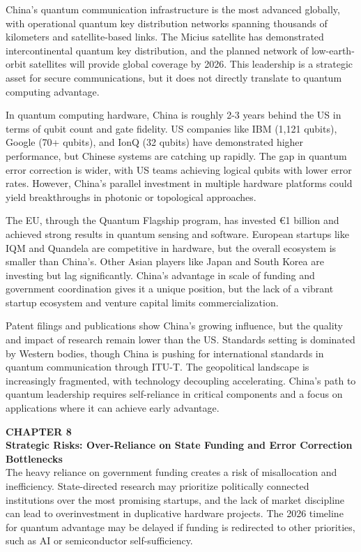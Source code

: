 \documentclass[10pt,a4paper]{article}
\newcommand{\kicker}[1]{\textcolor{BOBlue}{\scriptsize\bfseries\MakeUppercase{#1}}\\[-2pt]}
\newcommand{\Needspace}[1]{\par\vspace{2pt}}
\begin{document}
{\small China's quantum communication infrastructure is the most advanced globally, with operational quantum key distribution networks spanning thousands of kilometers and satellite-based links. The Micius satellite has demonstrated intercontinental quantum key distribution, and the planned network of low-earth-orbit satellites will provide global coverage by 2026. This leadership is a strategic asset for secure communications, but it does not directly translate to quantum computing advantage.}

{\small In quantum computing hardware, China is roughly 2-3 years behind the US in terms of qubit count and gate fidelity. US companies like IBM (1,121 qubits), Google (70+ qubits), and IonQ (32 qubits) have demonstrated higher performance, but Chinese systems are catching up rapidly. The gap in quantum error correction is wider, with US teams achieving logical qubits with lower error rates. However, China's parallel investment in multiple hardware platforms could yield breakthroughs in photonic or topological approaches.}

{\small The EU, through the Quantum Flagship program, has invested €1 billion and achieved strong results in quantum sensing and software. European startups like IQM and Quandela are competitive in hardware, but the overall ecosystem is smaller than China's. Other Asian players like Japan and South Korea are investing but lag significantly. China's advantage in scale of funding and government coordination gives it a unique position, but the lack of a vibrant startup ecosystem and venture capital limits commercialization.}

{\small Patent filings and publications show China's growing influence, but the quality and impact of research remain lower than the US. Standards setting is dominated by Western bodies, though China is pushing for international standards in quantum communication through ITU-T. The geopolitical landscape is increasingly fragmented, with technology decoupling accelerating. China's path to quantum leadership requires self-reliance in critical components and a focus on applications where it can achieve early advantage.}




\Needspace{55mm}
\kicker{Chapter 8}
{\Large\sffamily\bfseries\color{BONavy} Strategic Risks: Over-Reliance on State Funding and Error Correction Bottlenecks}\\[4pt]

{\small The heavy reliance on government funding creates a risk of misallocation and inefficiency. State-directed research may prioritize politically connected institutions over the most promising startups, and the lack of market discipline can lead to overinvestment in duplicative hardware projects. The 2026 timeline for quantum advantage may be delayed if funding is redirected to other priorities, such as AI or semiconductor self-sufficiency.}
\end{document}

